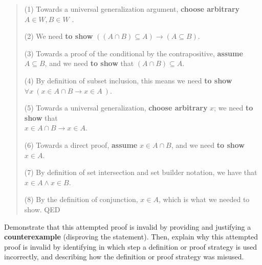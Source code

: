 \begin{enumerate}[labelindent=0pt, leftmargin=0pt]
\begin{enumerate}
    \begin{quote}
    (1) Towards a universal generalization argument, {\bf choose arbitrary} $A \in W, B \in W$ .
    
    (2) We need {\bf to show} $((A \cap B) \subseteq A) \to (A \subseteq B)$.
    
    (3) Towards a proof of the conditional by the contrapositive, {\bf assume} $A \subseteq B$, and we need {\bf to show} 
    that $(A \cap B) \subseteq A$.
    
    (4) By definition of subset inclusion, this means we need {\bf to show} 
    $\forall x ~( x \in A \cap B \to  x \in A  ~)$.
    
    (5) Towards a universal generalization, {\bf choose arbitrary} $x$; we need {\bf to show} that \\
    $x \in A \cap B \to x \in A$.
    
    (6) Towards a direct proof, {\bf assume} $x \in A \cap B$, and we need {\bf to show } $x \in A$.
    
    (7) By definition of set intersection and set builder notation, we have that $x \in A \land x \in B$.
    
    (8) By the definition of conjunction, $x \in A$, which is  what we needed to show. QED
    \end{quote}
    
    Demonstrate that this attempted proof is invalid by providing
    and justifying a {\bf counterexample} (disproving the statement).
    Then, explain why this attempted proof is 
    invalid by identifying in which step a definition or proof strategy is used incorrectly, and describing how the 
    definition or proof strategy was misused.


\end{enumerate}
\end{enumerate}
